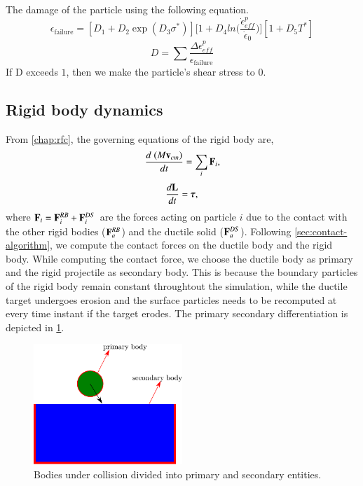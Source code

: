 The damage of the particle using the following equation.
\begin{equation}
  \epsilon_{\text{failure}} = [D_1 + D_2 \exp(D_3 \sigma^{*})]
  \bigg[ 1 + D_4 ln\big(\frac{\dot{\epsilon}_{eff}^p}{\dot{\epsilon}_{0}})\bigg]
  [1 + D_5 T^*]
\end{equation}
\begin{equation}
  D = \sum\frac{\Delta \epsilon_{eff}^p}{\epsilon_{\text{failure}}}
\end{equation}
If D exceeds $1$, then we make the particle's shear stress to $0$.



\subsection{Rigid body dynamics}
\label{chap-erosion:sec:rigid-body-dynamics}
From \cref{chap:rfc}, the governing equations of the rigid body are,
\begin{equation}
  \label{eq:balance_linear_mom}
  \frac{d \; (M \mathbf{v}_{cm})}{d t} = \sum_i \mathbf{F}_i,
\end{equation}
\begin{equation}
  \label{eq:balance_angular_mom}
  \frac{d \mathbf{L}}{d t} = \boldsymbol{\tau},
\end{equation}
where $\mathbf{F}_i = \mathbf{F}^{RB}_i + \mathbf{F}^{DS}_i$ are the forces acting on
particle $i$ due to the contact with the other rigid bodies ($\mathbf{F}^{RB}_a$)
and the ductile solid ($\mathbf{F}^{DS}_a$). Following
\cref{sec:contact-algorithm}, we compute the contact
forces on the ductile body and the rigid body. While computing the contact
force, we choose the ductile body as primary and the rigid projectile as
secondary body. This is because the boundary particles of the rigid body remain
constant throughtout the simulation, while the ductile target undergoes erosion and
the surface particles needs to be recomputed at every time instant if the target
erodes. The primary secondary differentiation is depicted in
\cref{fig:erosion-cnt-force-divide-bodies}.
\begin{figure}[!htpb]
  \centering
  \includegraphics[width=0.5\textwidth]{images/erosion/images/contact_force/contact_force_divide}
  \caption{Bodies under collision divided into primary and secondary entities.}
\label{fig:erosion-cnt-force-divide-bodies}
\end{figure}


